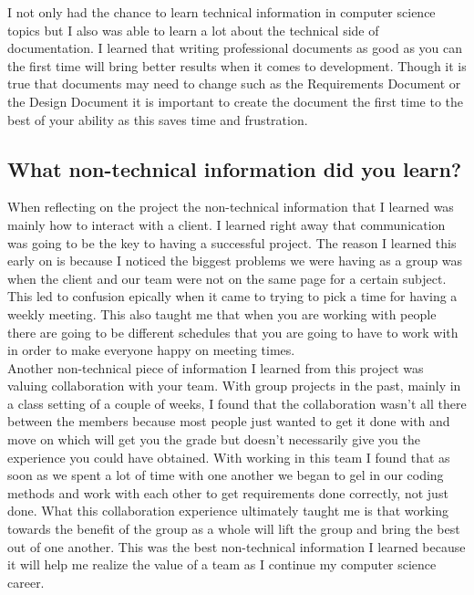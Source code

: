 \documentclass[draftclsnofoot,10pt,onecolumn]{IEEEtran} %
\begin{document}
I not only had the chance to learn technical information in computer science topics but I also was able to learn a lot about
the technical side of documentation. I learned that writing professional documents as good as you can the first time will bring
better results when it comes to development. Though it is true that documents may need to change such as the Requirements Document
or the Design Document it is important to create the document the first time to the best of your ability as this saves time
and frustration. \\

\subsection{What non-technical information did you learn?}
When reflecting on the project the non-technical information that I learned was mainly how to interact with a client. I learned
right away that communication was going to be the key to having a successful project. The reason I learned this early on is
because I noticed the biggest problems we were having as a group was when the client and our team were not on the same page
for a certain subject. This led to confusion epically when it came to trying to pick a time for having a weekly meeting. This
also taught me that when you are working with people there are going to be different schedules that you are going to have to 
work with in order to make everyone happy on meeting times. \\

Another non-technical piece of information I learned from this project was valuing collaboration with your team. With group
projects in the past, mainly in a class setting of a couple of weeks, I found that the collaboration wasn't all there between
the members because most people just wanted to get it done with and move on which will get you the grade but doesn't necessarily
give you the experience you could have obtained. With working in this team I found that as soon as we spent a lot of time with
one another we began to gel in our coding methods and work with each other to get requirements done correctly, not just done.
What this collaboration experience ultimately taught me is that working towards the benefit of the group as a whole will lift
the group and bring the best out of one another. This was the best non-technical information I learned because it will help me
realize the value of a team as I continue my computer science career. \\
\end{document}
